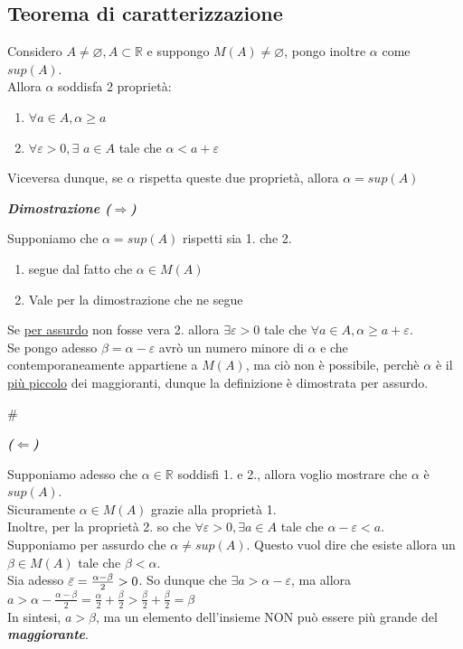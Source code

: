 \documentclass{article}
\theoremstyle{definition}
\begin{document}
\subsection{Teorema di caratterizzazione}
Considero $A\neq \varnothing, A \subset \mathbb{R}$ e suppongo $M(A) \neq \varnothing$, pongo inoltre $\alpha$ come $sup(A)$.
\\ Allora $\alpha$ soddisfa 2 proprietà:
\begin{enumerate}
    \item $\forall a \in A, \alpha \geqslant a$
    \item $\forall \varepsilon > 0, \exists \,\, a \in A$ tale che $\alpha < a+ \varepsilon$
\end{enumerate}
Viceversa dunque, se $\alpha$ rispetta queste due proprietà, allora $\alpha = sup(A)$
\begin{center}
    \textbf{\textit{Dimostrazione ($\Longrightarrow$)}}
\end{center}
Supponiamo che $\alpha=sup(A)$ rispetti sia 1. che 2.
\begin{enumerate}
    \item segue dal fatto che $\alpha \in M(A)$
    \item Vale per la dimostrazione che ne segue
\end{enumerate}
Se \underline{per assurdo} non fosse vera 2. allora $\exists \varepsilon>0$ tale che $\forall a \in A, \alpha \geqslant a + \varepsilon$.
\\ Se pongo adesso $\beta = \alpha - \varepsilon$ avrò un numero minore di $\alpha$ e che contemporaneamente appartiene a $M(A)$, ma ciò non è possibile, perchè $\alpha$ è il \underline{più piccolo} dei maggioranti, dunque la definizione è dimostrata per assurdo.
\begin{center}
   \#
\end{center}
\begin{center}
    \textbf{\textit{($\Longleftarrow$)}}
\end{center}
Supponiamo adesso che $\alpha \in \mathbb{R}$ soddisfi 1. e 2., allora voglio mostrare che $\alpha$ è $sup(A)$.
\\ Sicuramente $\alpha \in M(A)$ grazie alla proprietà 1.
\\ Inoltre, per la proprietà 2. so che $\forall \varepsilon>0, \exists a \in A$ tale che $\alpha-\varepsilon < a$.
\\
Supponiamo per assurdo che $\alpha \neq sup(A)$. Questo vuol dire che esiste allora un $\beta \in M(A)$ tale che $\beta < \alpha$.
\\ Sia adesso $\Bar{\varepsilon}=\frac{\alpha-\beta}{2}>0$. So dunque che $\exists a > \alpha - \varepsilon$, ma allora $a > \alpha - \frac{\alpha-\beta}{2}= \frac{\alpha}{2}+ \frac{\beta}{2}> \frac{\beta}{2}+ \frac{\beta}{2}=\beta$
\\ In sintesi, $a>\beta$, ma un elemento dell'insieme NON può essere più grande del \textbf{\textit{maggiorante}}.
\end{document}
